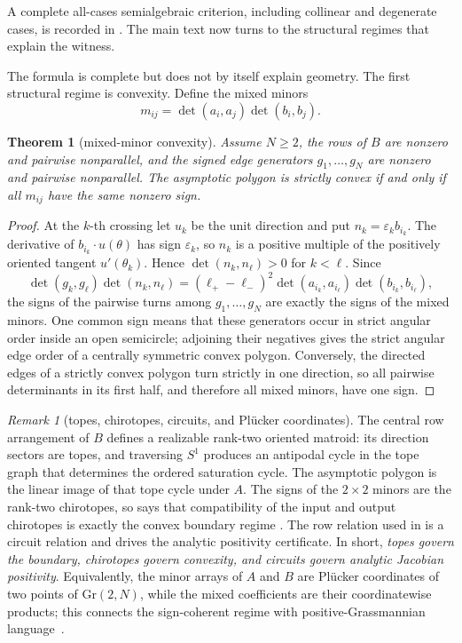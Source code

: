 \documentclass[11pt,twoside,leqno]{article}
\theoremstyle{plain}
\newtheorem{theorem}{Theorem}[section]
\theoremstyle{definition}
\theoremstyle{remark}
\newtheorem{remark}[remark]{Remark}
\begin{document}
A complete all-cases semialgebraic criterion, including collinear and degenerate cases, is recorded in . The main text now turns to the structural regimes that explain the witness.

The formula is complete but does not by itself explain geometry.  The first structural regime is convexity.  Define the mixed minors
\[
 m_{ij}=\det(a_i,a_j)\det(b_i,b_j).
\]

\begin{theorem}[mixed-minor convexity]\label{thm:mixed-convexity}
Assume $N\ge2$, the rows of $B$ are nonzero and pairwise nonparallel, and the signed edge generators $g_1,\ldots,g_N$ are nonzero and pairwise nonparallel.  The asymptotic polygon is strictly convex if and only if all $m_{ij}$ have the same nonzero sign.
\end{theorem}

\begin{proof}
At the $k$-th crossing let $u_k$ be the unit direction and put $n_k=\varepsilon_k b_{i_k}$.  The derivative of $b_{i_k}\cdot u(\theta)$ has sign $\varepsilon_k$, so $n_k$ is a positive multiple of the positively oriented tangent $u'(\theta_k)$.  Hence $\det(n_k,n_\ell)>0$ for $k<\ell$.  Since
\[
 \det(g_k,g_\ell)\det(n_k,n_\ell)
 = (\ell_+-\ell_-)^2
   \det(a_{i_k},a_{i_\ell})\det(b_{i_k},b_{i_\ell}),
\]
the signs of the pairwise turns among $g_1,\ldots,g_N$ are exactly the signs of the mixed minors.  One common sign means that these generators occur in strict angular order inside an open semicircle; adjoining their negatives gives the strict angular edge order of a centrally symmetric convex polygon.  Conversely, the directed edges of a strictly convex polygon turn strictly in one direction, so all pairwise determinants in its first half, and therefore all mixed minors, have one sign.
\end{proof}

\begin{remark}[topes, chirotopes, circuits, and Pl\"ucker coordinates]
\label{rmk:om-synthesis}
The central row arrangement of $B$ defines a realizable rank-two oriented matroid: its direction sectors are topes, and traversing $S^1$ produces an antipodal cycle in the tope graph that determines the ordered saturation cycle.  The asymptotic polygon is the linear image of that tope cycle under $A$. The signs of the $2\times2$ minors are the rank-two chirotopes, so  says that compatibility of the input and output chirotopes is exactly the convex boundary regime \cite{oriented-matroids}.  The row relation used in  is a circuit relation and drives the analytic positivity certificate.  In short, \emph{topes govern the boundary, chirotopes govern convexity, and circuits govern analytic Jacobian positivity}.  Equivalently, the minor arrays of $A$ and $B$ are Pl\"ucker coordinates of two points of $\mathrm{Gr}(2,N)$, while the mixed coefficients are their coordinatewise products; this connects the sign-coherent regime with positive-Grassmannian language~\cite{williams-positive-grassmannian}.
\end{remark}
\end{document}
